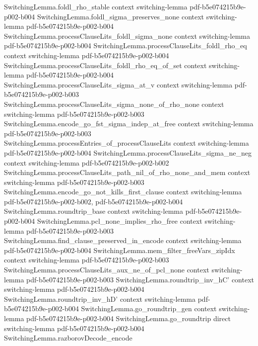 \begin{theorem}
\proofstep
  {SwitchingLemma.foldl_rho_stable}
  {context}
  {switching-lemma}
  {pdf-b5e074215b9e-p002-b004}
\proofstep
  {SwitchingLemma.foldl_sigma_preserves_none}
  {context}
  {switching-lemma}
  {pdf-b5e074215b9e-p002-b004}
\proofstep
  {SwitchingLemma.processClauseLits_foldl_sigma_none}
  {context}
  {switching-lemma}
  {pdf-b5e074215b9e-p002-b004}
\proofstep
  {SwitchingLemma.processClauseLits_foldl_rho_eq}
  {context}
  {switching-lemma}
  {pdf-b5e074215b9e-p002-b004}
\proofstep
  {SwitchingLemma.processClauseLits_foldl_rho_eq_of_set}
  {context}
  {switching-lemma}
  {pdf-b5e074215b9e-p002-b004}
\proofstep
  {SwitchingLemma.processClauseLits_sigma_at_v}
  {context}
  {switching-lemma}
  {pdf-b5e074215b9e-p002-b003}
\proofstep
  {SwitchingLemma.processClauseLits_sigma_none_of_rho_none}
  {context}
  {switching-lemma}
  {pdf-b5e074215b9e-p002-b003}
\proofstep
  {SwitchingLemma.encode_go_fst_sigma_indep_at_free}
  {context}
  {switching-lemma}
  {pdf-b5e074215b9e-p002-b003}
\proofstep
  {SwitchingLemma.processEntries_of_processClauseLits}
  {context}
  {switching-lemma}
  {pdf-b5e074215b9e-p002-b004}
\proofstep
  {SwitchingLemma.processClauseLits_sigma_ne_neg}
  {context}
  {switching-lemma}
  {pdf-b5e074215b9e-p002-b002}
\proofstep
  {SwitchingLemma.processClauseLits_path_nil_of_rho_none_and_mem}
  {context}
  {switching-lemma}
  {pdf-b5e074215b9e-p002-b003}
\proofstep
  {SwitchingLemma.encode_go_not_kills_first_clause}
  {context}
  {switching-lemma}
  {pdf-b5e074215b9e-p002-b002,
    pdf-b5e074215b9e-p002-b004}
\proofstep
  {SwitchingLemma.roundtrip_base}
  {context}
  {switching-lemma}
  {pdf-b5e074215b9e-p002-b004}
\proofstep
  {SwitchingLemma.pcl_none_implies_rho_free}
  {context}
  {switching-lemma}
  {pdf-b5e074215b9e-p002-b003}
\proofstep
  {SwitchingLemma.find_clause_preserved_in_encode}
  {context}
  {switching-lemma}
  {pdf-b5e074215b9e-p002-b004}
\proofstep
  {SwitchingLemma.mem_filter_freeVars_zipIdx}
  {context}
  {switching-lemma}
  {pdf-b5e074215b9e-p002-b003}
\proofstep
  {SwitchingLemma.processClauseLits_aux_ne_of_pcl_none}
  {context}
  {switching-lemma}
  {pdf-b5e074215b9e-p002-b003}
\proofstep
  {SwitchingLemma.roundtrip_inv_hC'}
  {context}
  {switching-lemma}
  {pdf-b5e074215b9e-p002-b004}
\proofstep
  {SwitchingLemma.roundtrip_inv_hD'}
  {context}
  {switching-lemma}
  {pdf-b5e074215b9e-p002-b004}
\proofstep
  {SwitchingLemma.go_roundtrip_gen}
  {context}
  {switching-lemma}
  {pdf-b5e074215b9e-p002-b004}
\proofstep
  {SwitchingLemma.go_roundtrip}
  {direct}
  {switching-lemma}
  {pdf-b5e074215b9e-p002-b004}
\proofstep
  {SwitchingLemma.razborovDecode_encode}

\end{theorem}
